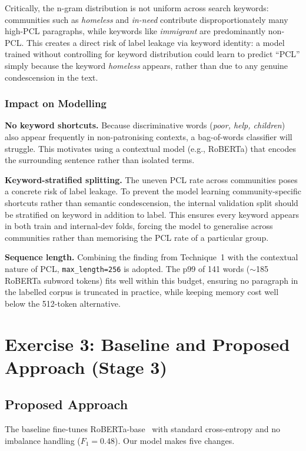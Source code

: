 \documentclass[11pt,a4paper]{article}
\begin{document}
Critically, the n-gram distribution is not uniform across search keywords:
communities such as \textit{homeless} and \textit{in-need} contribute
disproportionately many high-PCL paragraphs, while keywords like
\textit{immigrant} are predominantly non-PCL.  This creates a direct risk of
label leakage via keyword identity: a model trained without controlling for
keyword distribution could learn to predict ``PCL'' simply because the keyword
\textit{homeless} appears, rather than due to any genuine condescension in the
text.

\subsubsection{Impact on Modelling}

\textbf{No keyword shortcuts.}  Because discriminative words (\textit{poor,
help, children}) also appear frequently in non-patronising contexts, a
bag-of-words classifier will struggle.  This motivates using a contextual model
(e.g., RoBERTa) that encodes the surrounding sentence rather than isolated
terms.

\noindent\textbf{Keyword-stratified splitting.}  The uneven PCL rate across communities
poses a concrete risk of label leakage.  To prevent the model learning
community-specific shortcuts rather than semantic condescension, the internal
validation split should be stratified on keyword in addition to label.  This
ensures every keyword appears in both train and internal-dev folds, forcing the
model to generalise across communities rather than memorising the PCL rate of a
particular group.

\noindent\textbf{Sequence length.}  Combining the finding from Technique~1 with the
contextual nature of PCL, \texttt{max\_length=256} is adopted.  The p99 of 141
words ($\sim$185 RoBERTa subword tokens) fits well within this budget, ensuring
no paragraph in the labelled corpus is truncated in practice, while keeping
memory cost well below the 512-token alternative.

\section{Exercise 3: Baseline and Proposed Approach (Stage
3)}\label{sec:proposed_approach}

\subsection{Proposed Approach}
The baseline fine-tunes RoBERTa-base~\cite{liu2019roberta} with standard cross-entropy and no
imbalance handling ($F_1{=}0.48$). Our model makes five changes.
\end{document}
